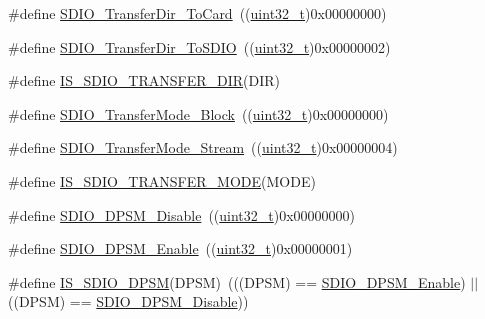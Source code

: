 \begin{DoxyCompactItemize}
\item 
\#define \hyperlink{group___s_d_i_o___transfer___direction_gaef8af0ffa4ea04b3362338d268cc0935}{S\+D\+I\+O\+\_\+\+Transfer\+Dir\+\_\+\+To\+Card}~((\hyperlink{_p_e___types_8h_a33594304e786b158f3fb30289278f5af}{uint32\+\_\+t})0x00000000)
\item 
\#define \hyperlink{group___s_d_i_o___transfer___direction_ga55a6d9613d3e2e7762296b45d0d13222}{S\+D\+I\+O\+\_\+\+Transfer\+Dir\+\_\+\+To\+S\+D\+IO}~((\hyperlink{_p_e___types_8h_a33594304e786b158f3fb30289278f5af}{uint32\+\_\+t})0x00000002)
\item 
\#define \hyperlink{group___s_d_i_o___transfer___direction_gaf84b8004cfef6a5a525b20db8a83c2f7}{I\+S\+\_\+\+S\+D\+I\+O\+\_\+\+T\+R\+A\+N\+S\+F\+E\+R\+\_\+\+D\+IR}(D\+IR)
\item 
\#define \hyperlink{group___s_d_i_o___transfer___type_ga5b54ada18cc4072ceff1d98ee4b69972}{S\+D\+I\+O\+\_\+\+Transfer\+Mode\+\_\+\+Block}~((\hyperlink{_p_e___types_8h_a33594304e786b158f3fb30289278f5af}{uint32\+\_\+t})0x00000000)
\item 
\#define \hyperlink{group___s_d_i_o___transfer___type_gadd0cafe0a80e6b6cc5c22d838cbb2e28}{S\+D\+I\+O\+\_\+\+Transfer\+Mode\+\_\+\+Stream}~((\hyperlink{_p_e___types_8h_a33594304e786b158f3fb30289278f5af}{uint32\+\_\+t})0x00000004)
\item 
\#define \hyperlink{group___s_d_i_o___transfer___type_gaf7565ea93f9ed01558bdc9ad80dac763}{I\+S\+\_\+\+S\+D\+I\+O\+\_\+\+T\+R\+A\+N\+S\+F\+E\+R\+\_\+\+M\+O\+DE}(M\+O\+DE)
\item 
\#define \hyperlink{group___s_d_i_o___d_p_s_m___state_ga156a9f6ab87a46dcb99ddd7462ca064b}{S\+D\+I\+O\+\_\+\+D\+P\+S\+M\+\_\+\+Disable}~((\hyperlink{_p_e___types_8h_a33594304e786b158f3fb30289278f5af}{uint32\+\_\+t})0x00000000)
\item 
\#define \hyperlink{group___s_d_i_o___d_p_s_m___state_ga22bc12465c1cf839145619a859276c37}{S\+D\+I\+O\+\_\+\+D\+P\+S\+M\+\_\+\+Enable}~((\hyperlink{_p_e___types_8h_a33594304e786b158f3fb30289278f5af}{uint32\+\_\+t})0x00000001)
\item 
\#define \hyperlink{group___s_d_i_o___d_p_s_m___state_gac87a2d7a8fc417a4514d733be50e6d63}{I\+S\+\_\+\+S\+D\+I\+O\+\_\+\+D\+P\+SM}(D\+P\+SM)~(((D\+P\+SM) == \hyperlink{openmotestm_2library_2inc_2stm32f10x__sdio_8h_a22bc12465c1cf839145619a859276c37}{S\+D\+I\+O\+\_\+\+D\+P\+S\+M\+\_\+\+Enable}) $\vert$$\vert$ ((D\+P\+SM) == \hyperlink{openmotestm_2library_2inc_2stm32f10x__sdio_8h_a156a9f6ab87a46dcb99ddd7462ca064b}{S\+D\+I\+O\+\_\+\+D\+P\+S\+M\+\_\+\+Disable}))
$$
\end{DoxyCompactItemize}
